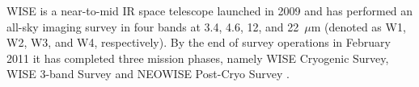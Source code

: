 \documentclass[numberedappendix,apj,twocolumn]{emulateapj}
\begin{document}




WISE \citep{Wright2010} is a near-to-mid IR space telescope launched in 2009 and has performed an all-sky imaging survey in four bands at 3.4, 4.6, 12, and 22~$\mu$m (denoted as W1, W2, W3, and W4, respectively). By the end of survey operations in February 2011 it has completed three mission phases, namely WISE Cryogenic Survey, WISE 3-band Survey and NEOWISE Post-Cryo Survey \citep{2011ApJ...731...53M}.
\end{document}
